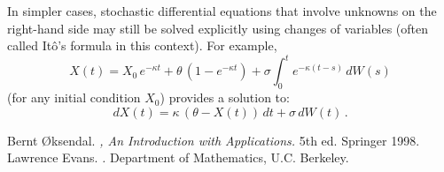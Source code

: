 \documentclass[12pt]{article}
\begin{document}
In simpler cases, stochastic differential equations that
involve unknowns on the right-hand side may still be solved
explicitly using changes of variables (often called It\^o's formula
in this context).
For example, 
\[
X(t) = X_0 \, e^{-\kappa t} + \theta \, (1 - e^{-\kappa t})
+ \sigma \int_0^t e^{-\kappa (t-s)} \, dW(s)
\]
(for any initial condition $X_0$) provides a solution to:
\[
dX(t) = \kappa\, (\theta - X(t)) \, dt + \sigma \, dW(t)\,.
\]

\begin{thebibliography}{9}
Bernt \O ksendal.
{\em {},
An Introduction with Applications.} 5th ed. Springer 1998.
Lawrence Evans. {\em {}.} Department of Mathematics, 
U.C. Berkeley.
\end{thebibliography}

\end{document}
